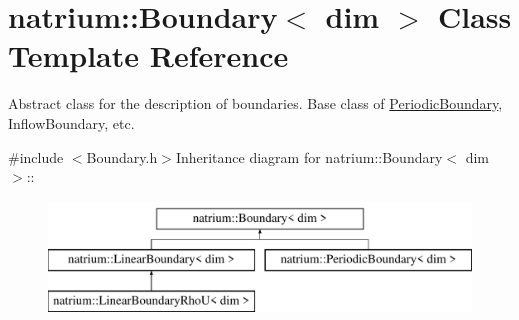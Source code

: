 \hypertarget{classnatrium_1_1Boundary}{
\section{natrium::Boundary$<$ dim $>$ Class Template Reference}
\label{classnatrium_1_1Boundary}
}


Abstract class for the description of boundaries. Base class of \hyperlink{classnatrium_1_1PeriodicBoundary}{PeriodicBoundary}, InflowBoundary, etc.  


{\ttfamily \#include $<$Boundary.h$>$}Inheritance diagram for natrium::Boundary$<$ dim $>$::\begin{figure}[H]
\begin{center}
\leavevmode
\includegraphics[height=3cm]{classnatrium_1_1Boundary}
\end{center}
\end{figure}
